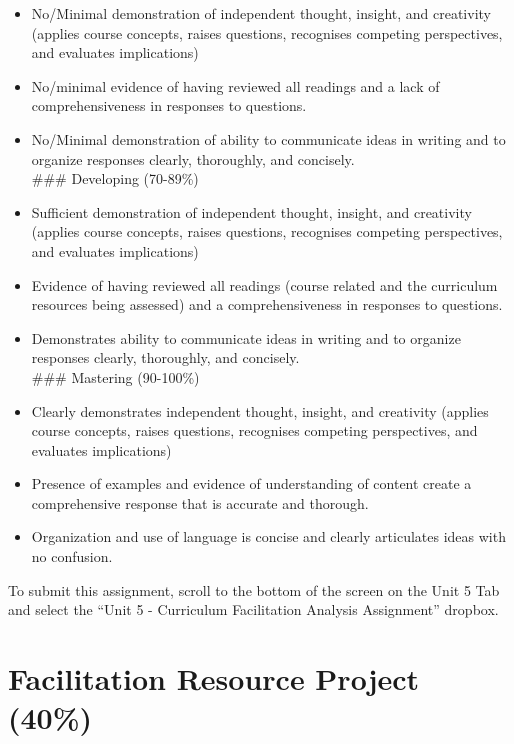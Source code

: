 \documentclass[
]{book}
\providecommand{\tightlist}{%
  \setlength{\itemsep}{0pt}\setlength{\parskip}{0pt}}
\begin{document}
\begin{itemize}
\tightlist
\item
  No/Minimal demonstration of independent thought, insight, and creativity (applies course concepts, raises questions, recognises competing perspectives, and evaluates implications)\\
\item
  No/minimal evidence of having reviewed all readings and a lack of comprehensiveness in responses to questions.
\item
  No/Minimal demonstration of ability to communicate ideas in writing and to organize responses clearly, thoroughly, and concisely.\\
  \#\#\# Developing (70-89\%)\\
\item
  Sufficient demonstration of independent thought, insight, and creativity (applies course concepts, raises questions, recognises competing perspectives, and evaluates implications)
\item
  Evidence of having reviewed all readings (course related and the curriculum resources being assessed) and a comprehensiveness in responses to questions.
\item
  Demonstrates ability to communicate ideas in writing and to organize responses clearly, thoroughly, and concisely.\\
  \#\#\# Mastering (90-100\%)
\item
  Clearly demonstrates independent thought, insight, and creativity (applies course concepts, raises questions, recognises competing perspectives, and evaluates implications)
\item
  Presence of examples and evidence of understanding of content create a comprehensive response that is accurate and thorough.
\item
  Organization and use of language is concise and clearly articulates ideas with no confusion.
\end{itemize}

To submit this assignment, scroll to the bottom of the screen on the Unit 5 Tab and select the ``Unit 5 - Curriculum Facilitation Analysis Assignment'' dropbox.

\hypertarget{facilitation-resource-project-40}{%
\section{Facilitation Resource Project (40\%)}\label{facilitation-resource-project-40}}
\end{document}
